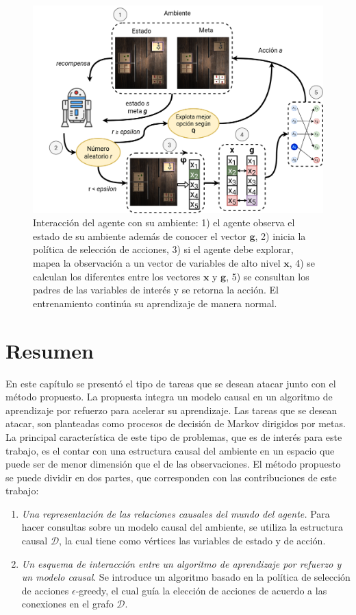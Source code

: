  \begin{figure}
     \centering
     \includegraphics[scale=0.25]{Chapter4/Figs/example_method.png}
     \caption{Interacción del agente con su ambiente: 1) el agente observa el estado de su ambiente además de conocer el vector $\mathbf{g}$, 2) inicia
     la política de selección de acciones, 3) si el agente debe explorar, mapea la observación a un vector de variables de alto nivel $\mathbf{x}$, 4) se calculan los diferentes entre los vectores $\mathbf{x}$ y $\mathbf{g}$, 5) se consultan los padres de las variables de interés y se retorna la acción. El entrenamiento continúa su aprendizaje de manera normal.}
     \label{fig:example-switches}
 \end{figure}
 
 \clearpage
 \section{Resumen}
 
En este capítulo se presentó el tipo de tareas que se 
desean atacar junto con el método propuesto. La propuesta
integra un modelo causal en un algoritmo de aprendizaje por refuerzo para
acelerar su aprendizaje.
Las tareas que se desean atacar, son 
planteadas como procesos de decisión de Markov dirigidos por metas.
La principal característica de este tipo de problemas, que es de interés para este trabajo,
es el contar con una estructura causal del ambiente en un espacio 
que puede ser de menor dimensión que el de las observaciones.
El método propuesto se puede dividir en dos partes, que
corresponden con las contribuciones de este trabajo:

\begin{enumerate}
    \item \textit{Una representación de las relaciones causales del mundo del agente.} Para hacer consultas sobre un modelo causal del ambiente, se utiliza la estructura causal $\mathcal{D}$, la cual tiene como vértices las variables de estado y de acción.
    \item  \textit{Un esquema de interacción entre un algoritmo de aprendizaje por refuerzo
    y un modelo causal}. Se introduce un algoritmo basado en la política de selección
    de acciones $\epsilon$-greedy, el cual guía la elección de acciones de acuerdo
    a las conexiones en el grafo $\mathcal{D}$.
\end{enumerate}
